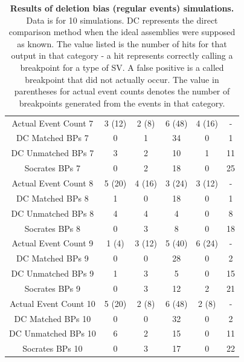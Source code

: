 \documentclass{easychithesis}
\begin{document}
\begin{table}[h]
\begin{center}
\begin{tabular}{|c|c|c|c|c|c|}
         \hline 
        Actual Event Count 7 & 3 (12) & 2 (8) & 6 (48) & 4 (16) & -\\
        DC Matched BPs 7 & 0 & 1 & 34 & 0 & 1\\
        DC Unmatched BPs 7 & 3 & 2 & 10 & 1 & 11\\
        Socrates BPs 7 & 0 & 2 & 18 & 0 & 25\\
         \hline 
        Actual Event Count 8 & 5 (20) & 4 (16) & 3 (24) & 3 (12) & -\\
        DC Matched BPs 8 & 1 & 0 & 18 & 0 & 1\\
        DC Unmatched BPs 8 & 4 & 4 & 4 & 0 & 8\\
        Socrates BPs 8 & 0 & 3 & 8 & 0 & 18\\
         \hline 
        Actual Event Count 9 & 1 (4) & 3 (12) & 5 (40) & 6 (24) & -\\
        DC Matched BPs 9 & 0 & 0 & 28 & 0 & 2\\
        DC Unmatched BPs 9 & 1 & 3 & 5 & 0 & 15\\
        Socrates BPs 9 & 0 & 3 & 12 & 2 & 21\\
         \hline 
        Actual Event Count 10 & 5 (20) & 2 (8) & 6 (48) & 2 (8) & -\\
        DC Matched BPs 10 & 0 & 0 & 32 & 0 & 2\\
        DC Unmatched BPs 10 & 6 & 2 & 15 & 0 & 11\\
        Socrates BPs 10 & 0 & 3 & 17 & 0 & 22\\        
        \hline
\end{tabular}
\caption{{\bf Results of deletion bias (regular events) simulations.} Data is for 10 simulations. DC represents the direct comparison method when the ideal assemblies were supposed as known. The value listed is the number of hits for that output in that category - a hit represents correctly calling a breakpoint for a type of SV. A false positive is a called breakpoint that did not actually occur. The value in parentheses for actual event counts denotes the number of breakpoints generated from the events in that category.}
\end{center}
\end{table}


\end{document}
